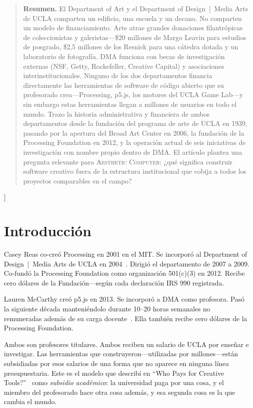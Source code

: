 \documentclass[10pt,letterpaper,twocolumn]{article}
\newcommand{\ac}{\textsc{Aesthetic Computer}}
\newcommand{\dma}{\textsc{DMA}}
\begin{document}
{\begin{quote}
\small\noindent\textbf{Resumen.}
El Department of Art y el Department of Design~|~Media Arts de UCLA comparten un edificio, una escuela y un decano. No comparten un modelo de financiamiento. Arte atrae grandes donaciones filantrópicas de coleccionistas y galeristas---\$20 millones de Margo Leavin para estudios de posgrado, \$2,5 millones de los Resnick para una cátedra dotada y un laboratorio de fotografía. \dma{} funciona con becas de investigación externas (NSF, Getty, Rockefeller, Creative Capital) y asociaciones interinstitucionales. Ninguno de los dos departamentos financia directamente las herramientas de software de código abierto que su profesorado crea---Processing, p5.js, los motores del UCLA Game Lab---y sin embargo estas herramientas llegan a millones de usuarios en todo el mundo. Trazo la historia administrativa y financiera de ambos departamentos desde la fundación del programa de arte de UCLA en 1939, pasando por la apertura del Broad Art Center en 2006, la fundación de la Processing Foundation en 2012, y la operación actual de seis iniciativas de investigación con nombre propio dentro de \dma{}. El artículo plantea una pregunta relevante para \ac{}: ¿qué significa construir software creativo fuera de la estructura institucional que cobija a todos los proyectos comparables en el campo?
\end{quote}
\vspace{0.5em}
}]

\section{Introducción}

Casey Reas co-creó Processing en 2001 en el MIT. Se incorporó al Department of Design~|~Media Arts de UCLA en 2004~\citep{dmahistory}. Dirigió el departamento de 2007 a 2009. Co-fundó la Processing Foundation como organización 501(c)(3) en 2012. Recibe cero dólares de la Fundación---según cada declaración IRS 990 registrada.

Lauren McCarthy creó p5.js en 2013. Se incorporó a \dma{} como profesora. Pasó la siguiente década manteniéndolo durante 10--20 horas semanales no remuneradas además de su carga docente~\citep{mccarthy2023making}. Ella también recibe cero dólares de la Processing Foundation.

Ambos son profesores titulares. Ambos reciben un salario de UCLA por enseñar e investigar. Las herramientas que construyeron---utilizadas por millones---están subsidiadas por esos salarios de una forma que no aparece en ninguna línea presupuestaria. Este es el modelo que describí en ``Who Pays for Creative Tools?''~\citep{scudder2026sustainability} como \emph{subsidio académico}: la universidad paga por una cosa, y el miembro del profesorado hace otra cosa además, y esa segunda cosa es la que cambia el mundo.
\end{document}

